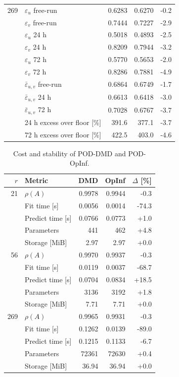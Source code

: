 \begin{table}[t]
\begin{tabular}{rlrrr}
\midrule
269 & $\varepsilon_u$ free-run & 0.6283 & 0.6270 & -0.2 \\
 & $\varepsilon_v$ free-run & 0.7444 & 0.7227 & -2.9 \\
 & $\varepsilon_u$ 24 h & 0.5018 & 0.4893 & -2.5 \\
 & $\varepsilon_v$ 24 h & 0.8209 & 0.7944 & -3.2 \\
 & $\varepsilon_u$ 72 h & 0.5770 & 0.5653 & -2.0 \\
 & $\varepsilon_v$ 72 h & 0.8286 & 0.7881 & -4.9 \\
 & $\bar\varepsilon_{u,v}$ free-run & 0.6864 & 0.6749 & -1.7 \\
 & $\bar\varepsilon_{u,v}$ 24 h & 0.6613 & 0.6418 & -3.0 \\
 & $\bar\varepsilon_{u,v}$ 72 h & 0.7028 & 0.6767 & -3.7 \\
 & 24 h excess over floor [\%] & 391.6 & 377.1 & -3.7 \\
 & 72 h excess over floor [\%] & 422.5 & 403.0 & -4.6 \\
\bottomrule
\end{tabular}
\end{table}

\begin{table}[t]
\centering
\small
\caption{Cost and stability of POD-DMD and POD-OpInf.}
\label{tab:rom_cost}
\begin{tabular}{rlrrr}
\toprule
$r$ & Metric & DMD & OpInf & $\Delta$ [\%] \\
\midrule
21 & $\rho(A)$ & 0.9978 & 0.9944 & -0.3 \\
 & Fit time [s] & 0.0056 & 0.0014 & -74.3 \\
 & Predict time [s] & 0.0766 & 0.0773 & +1.0 \\
 & Parameters & 441 & 462 & +4.8 \\
 & Storage [MiB] & 2.97 & 2.97 & +0.0 \\
\midrule
56 & $\rho(A)$ & 0.9970 & 0.9937 & -0.3 \\
 & Fit time [s] & 0.0119 & 0.0037 & -68.7 \\
 & Predict time [s] & 0.0704 & 0.0834 & +18.5 \\
 & Parameters & 3136 & 3192 & +1.8 \\
 & Storage [MiB] & 7.71 & 7.71 & +0.0 \\
\midrule
269 & $\rho(A)$ & 0.9965 & 0.9931 & -0.3 \\
 & Fit time [s] & 0.1262 & 0.0139 & -89.0 \\
 & Predict time [s] & 0.1215 & 0.1133 & -6.7 \\
 & Parameters & 72361 & 72630 & +0.4 \\
 & Storage [MiB] & 36.94 & 36.94 & +0.0 \\
\bottomrule
\end{tabular}
\end{table}